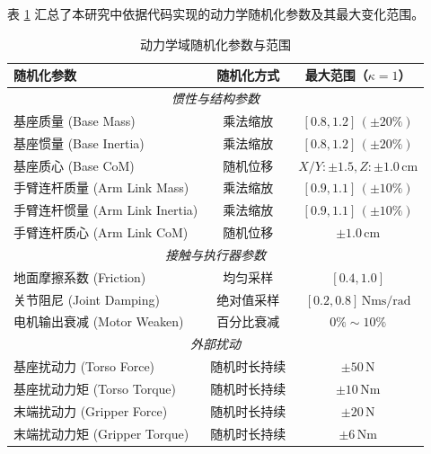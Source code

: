 表 \ref{tab:randomization_params} 汇总了本研究中依据代码实现的动力学随机化参数及其最大变化范围。
\begin{table}[H]
    \centering
    \caption{动力学域随机化参数与范围}
    \label{tab:randomization_params}
    \begin{tabular}{lcc}
        \toprule
        \textbf{随机化参数}            & \textbf{随机化方式} & \textbf{最大范围（$\kappa=1$）}             \\
        \midrule
        \multicolumn{3}{c}{\textit{惯性与结构参数}}                                               \\
        基座质量 (Base Mass)          & 乘法缩放           & $[0.8, 1.2] \, ( \pm 20\%)$           \\
        基座惯量 (Base Inertia)       & 乘法缩放           & $[0.8, 1.2] \, ( \pm 20\%)$           \\
        基座质心 (Base CoM)           & 随机位移           & $X/Y:\pm 1.5, Z:\pm 1.0 \, \text{cm}$ \\
        手臂连杆质量 (Arm Link Mass)    & 乘法缩放           & $[0.9, 1.1] \, ( \pm 10\%)$           \\
        手臂连杆惯量 (Arm Link Inertia) & 乘法缩放           & $[0.9, 1.1] \, ( \pm 10\%)$           \\
        手臂连杆质心 (Arm Link CoM)     & 随机位移           & $\pm 1.0 \, \text{cm}$                \\
        \midrule
        \multicolumn{3}{c}{\textit{接触与执行器参数}}                                              \\
        地面摩擦系数 (Friction)         & 均匀采样           & $[0.4, 1.0]$                          \\
        关节阻尼 (Joint Damping)      & 绝对值采样          & $[0.2, 0.8] \, \text{Nms/rad}$        \\
        电机输出衰减 (Motor Weaken)     & 百分比衰减          & $0\% \sim 10\%$                       \\
        \midrule
        \multicolumn{3}{c}{\textit{外部扰动}}                                                  \\
        基座扰动力 (Torso Force)       & 随机时长持续         & $\pm 50 \, \text{N}$                  \\
        基座扰动力矩 (Torso Torque)     & 随机时长持续         & $\pm 10 \, \text{Nm}$                 \\
        末端扰动力 (Gripper Force)     & 随机时长持续         & $\pm 20 \, \text{N}$                  \\
        末端扰动力矩 (Gripper Torque)   & 随机时长持续         & $\pm 6 \, \text{Nm}$                  \\
        \bottomrule
    \end{tabular}
\end{table}

